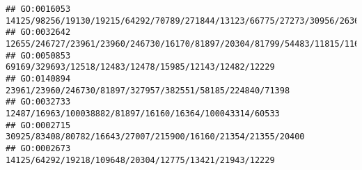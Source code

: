 \documentclass[
]{article}
\begin{document}
\begin{verbatim}
## GO:0016053                                                                                                                                                                                                                                                        14125/98256/19130/19215/64292/70789/271844/13123/66775/27273/30956/26367/20216/15930/382044/104158/13897/11808/66113/103142/209027/71275/268756/16149
## GO:0032642                                                                                                                                                                                                                                                                                                                              12655/246727/23961/23960/246730/16170/81897/20304/81799/54483/11815/11629/16149
## GO:0050853                                                                                                                                                                                                                                                                                                                                                       69169/329693/12518/12483/12478/15985/12143/12482/12229
## GO:0140894                                                                                                                                                                                                                                                                                                                                                    23961/23960/246730/81897/327957/382551/58185/224840/71398
## GO:0032733                                                                                                                                                                                                                                                                                                                                                      12487/16963/100038882/81897/16160/16364/100043314/60533
## GO:0002715                                                                                                                                                                                                                                                                                                                                                 30925/83408/80782/16643/27007/215900/16160/21354/21355/20400
## GO:0002673                                                                                                                                                                                                                                                                                                                                                       14125/64292/19218/109648/20304/12775/13421/21943/12229

\end{verbatim}
\end{document}
